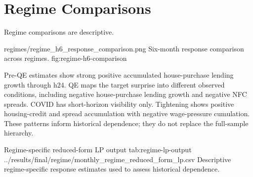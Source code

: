 \section{Regime Comparisons}

Regime comparisons are descriptive.

\thesisfigure
  {regimes/regime_h6_response_comparison.png}
  {Six-month response comparison across regimes.}
  {fig:regime-h6-comparison}

Pre-QE estimates show strong positive accumulated house-purchase lending growth through h24. QE maps the target surprise into different observed conditions, including negative house-purchase lending growth and negative NFC spreads. COVID has short-horizon visibility only. Tightening shows positive housing-credit and spread accumulation with negative wage-pressure cumulation. These patterns inform historical dependence; they do not replace the full-sample hierarchy.

\artifacttable
  {Regime-specific reduced-form LP output}
  {tab:regime-lp-output}
  {../results/final/regime/monthly_regime_reduced_form_lp.csv}
  {Descriptive regime-specific response estimates used to assess historical dependence.}
